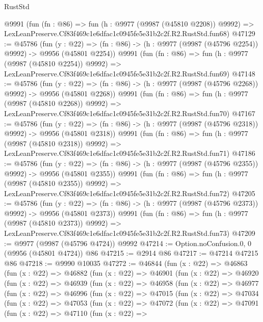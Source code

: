 \begin{lexlean}{RustStd}
\begin{coremodule}
    @9991
    (fun (fn : @86) =>
    fun (h : @9977 (@9987 (@45810 @2208)) @9992) =>
    LexLeanPreserve.Cf83f469c1e6dfac1c0945fe5e31b2c2f.R2.RustStd.fun68)
@47129 := @45786
    (fun (y : @22) =>
    (fn : @86) -> (h : @9977 (@9987 (@45796 @2254)) @9992) -> @9956 (@45801 @2254))
    @9991
    (fun (fn : @86) =>
    fun (h : @9977 (@9987 (@45810 @2254)) @9992) =>
    LexLeanPreserve.Cf83f469c1e6dfac1c0945fe5e31b2c2f.R2.RustStd.fun69)
@47148 := @45786
    (fun (y : @22) =>
    (fn : @86) -> (h : @9977 (@9987 (@45796 @2268)) @9992) -> @9956 (@45801 @2268))
    @9991
    (fun (fn : @86) =>
    fun (h : @9977 (@9987 (@45810 @2268)) @9992) =>
    LexLeanPreserve.Cf83f469c1e6dfac1c0945fe5e31b2c2f.R2.RustStd.fun70)
@47167 := @45786
    (fun (y : @22) =>
    (fn : @86) -> (h : @9977 (@9987 (@45796 @2318)) @9992) -> @9956 (@45801 @2318))
    @9991
    (fun (fn : @86) =>
    fun (h : @9977 (@9987 (@45810 @2318)) @9992) =>
    LexLeanPreserve.Cf83f469c1e6dfac1c0945fe5e31b2c2f.R2.RustStd.fun71)
@47186 := @45786
    (fun (y : @22) =>
    (fn : @86) -> (h : @9977 (@9987 (@45796 @2355)) @9992) -> @9956 (@45801 @2355))
    @9991
    (fun (fn : @86) =>
    fun (h : @9977 (@9987 (@45810 @2355)) @9992) =>
    LexLeanPreserve.Cf83f469c1e6dfac1c0945fe5e31b2c2f.R2.RustStd.fun72)
@47205 := @45786
    (fun (y : @22) =>
    (fn : @86) -> (h : @9977 (@9987 (@45796 @2373)) @9992) -> @9956 (@45801 @2373))
    @9991
    (fun (fn : @86) =>
    fun (h : @9977 (@9987 (@45810 @2373)) @9992) =>
    LexLeanPreserve.Cf83f469c1e6dfac1c0945fe5e31b2c2f.R2.RustStd.fun73)
@47209 := @9977 (@9987 (@45796 @4724)) @9992
@47214 := Option.noConfusion.{0, 0} (@9956 (@45801 @4724)) @86
@47215 := @2914 @86
@47217 := @47214 @47215 @86
@47218 := @9990 @10035
@47272 := @46844
    (fun (x : @22) =>
    @46863
      (fun (x : @22) =>
      @46882
        (fun (x : @22) =>
        @46901
          (fun (x : @22) =>
          @46920
            (fun (x : @22) =>
            @46939
              (fun (x : @22) =>
              @46958
                (fun (x : @22) =>
                @46977
                  (fun (x : @22) =>
                  @46996
                    (fun (x : @22) =>
                    @47015
                      (fun (x : @22) =>
                      @47034
                        (fun (x : @22) =>
                        @47053
                          (fun (x : @22) =>
                          @47072
                            (fun (x : @22) =>
                            @47091
                              (fun (x : @22) =>
                              @47110
                                (fun (x : @22) =>

\end{coremodule}
\end{lexlean}
